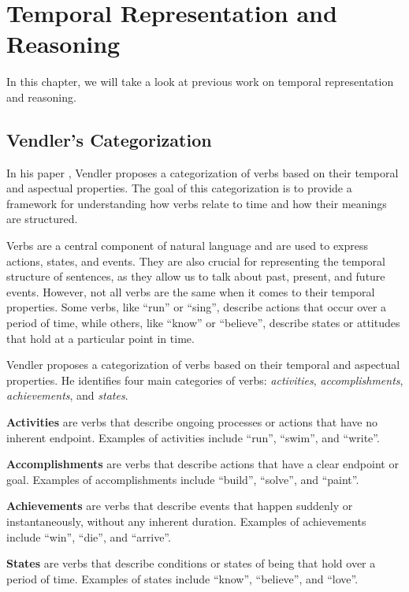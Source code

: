 \chapter{Temporal Representation and Reasoning}
\label{ch:states-and-events}
In this chapter, we will take a look at previous work on temporal representation and reasoning.


\section{Vendler's Categorization}

In his paper \cite{vendler1957verbs}, Vendler proposes a categorization of verbs based on their temporal and aspectual properties. The goal of this categorization is to provide a framework for understanding how verbs relate to time and how their meanings are structured.

Verbs are a central component of natural language and are used to express actions, states, and events. They are also crucial for representing the temporal structure of sentences, as they allow us to talk about past, present, and future events. However, not all verbs are the same when it comes to their temporal properties. Some verbs, like ``run'' or ``sing'', describe actions that occur over a period of time, while others, like ``know'' or ``believe'', describe states or attitudes that hold at a particular point in time.


Vendler proposes a categorization of verbs based on their temporal and aspectual properties. He identifies four main categories of verbs: \textit{activities}, \textit{accomplishments}, \textit{achievements}, and \textit{states}.

\textbf{Activities} are verbs that describe ongoing processes or actions that have no inherent endpoint. Examples of activities include ``run'', ``swim'', and ``write''.


\textbf{Accomplishments} are verbs that describe actions that have a clear endpoint or goal. Examples of accomplishments include ``build'', ``solve'', and ``paint''.


\textbf{Achievements} are verbs that describe events that happen suddenly or instantaneously, without any inherent duration. Examples of achievements include ``win'', ``die'', and ``arrive''.


\textbf{States} are verbs that describe conditions or states of being that hold over a period of time. Examples of states include ``know'', ``believe'', and ``love''.

